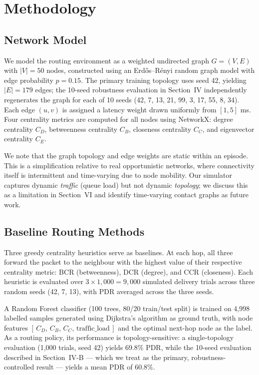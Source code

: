 \documentclass[conference]{IEEEtran}
\begin{document}
\section{Methodology}

\subsection{Network Model}
We model the routing environment as a weighted undirected graph
 $G = (V, E)$ with $|V| = 50$ nodes, constructed using an
Erdős–Rényi random graph model with edge probability $p = 0.15$.
The primary training topology uses seed 42, yielding $|E| = 179$ edges; the 10-seed robustness evaluation in Section~IV
independently regenerates the graph for each of 10 seeds
(42, 7, 13, 21, 99, 3, 17, 55, 8, 34). Each edge $(u, v)$ is
assigned a latency weight drawn uniformly from $[1, 5]$ ms. Four
centrality metrics are computed for all nodes using NetworkX:
degree centrality $C_D$, betweenness centrality $C_B$, closeness
centrality $C_C$, and eigenvector centrality $C_E$.

We note that the graph topology and edge weights are static within
an episode. This is a simplification relative to real opportunistic
networks, where connectivity itself is intermittent and
time-varying due to node mobility. Our simulator captures dynamic
\emph{traffic} (queue load) but not dynamic \emph{topology}; we
discuss this as a limitation in Section~VI and identify time-varying
contact graphs as future work.

\subsection{Baseline Routing Methods}
Three greedy centrality heuristics serve as baselines. At each
hop, all three forward the packet to the neighbour with the
highest value of their respective centrality metric:
BCR (betweenness), DCR (degree), and CCR (closeness).
Each heuristic is evaluated over $3 \times 1{,}000 = 9{,}000$ simulated delivery trials across three random seeds (42, 7, 13),
with PDR averaged across the three seeds.

A Random Forest classifier (100 trees, 80/20 train/test split)
is trained on 4,998 labelled samples generated using Dijkstra's
algorithm as ground truth, with node features
 $[\,C_D,\, C_B,\, C_C,\, \text{traffic\_load}\,]$ and the
optimal next-hop node as the label. As a routing policy, its
performance is topology-sensitive: a single-topology evaluation
(1,000 trials, seed 42) yields 69.8\% PDR, while the 10-seed
evaluation described in Section~IV-B — which we treat as the
primary, robustness-controlled result — yields a mean PDR of
60.8\%.
\end{document}
